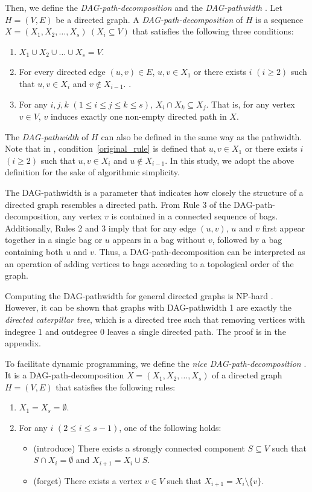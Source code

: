 \documentclass[runningheads]{llncs}
\theoremstyle{plain}
\theoremstyle{definition}
\begin{document}
Then, we define the \emph{DAG-path-decomposition} and the \emph{DAG-pathwidth} \cite{art12}. Let $H = (V, E)$ be a directed graph. A \emph{DAG-path-decomposition} of $H$ is a sequence $X = (X_1, X_2, \dots, X_s) ~(X_i \subseteq V)$ that satisfies the following three conditions:
\begin{enumerate}
    \item $X_1 \cup X_2 \cup \dots \cup X_s = V$.
    \item For every directed edge $(u, v) \in E$, $u, v \in X_1$ or there exists $i$ $(i \geq 2)$ such that $u, v \in X_i$ and $v \notin X_{i-1}$. \label{original_rule}.
    \item For any $i, j, k$ $(1 \leq i \leq j \leq k \leq s)$, $X_i \cap X_k \subseteq X_j$. That is, for any vertex $v \in V$, $v$ induces exactly one non-empty directed path in $X$.
\end{enumerate}

The \emph{DAG-pathwidth} of $H$ can also be defined in the same way as the pathwidth. Note that in \cite{art12}, condition~\ref{original_rule} is defined that $u, v \in X_1$ or there exists $i$ $(i \geq 2)$ such that $u, v \in X_i$ and $u \notin X_{i-1}$. In this study, we adopt the above definition for the sake of algorithmic simplicity.

The DAG-pathwidth is a parameter that indicates how closely the structure of a directed graph resembles a directed path. From Rule 3 of the DAG-path-decomposition, any vertex $v$ is contained in a connected sequence of bags. Additionally, Rules 2 and 3 imply that for any edge $(u, v)$, $u$ and $v$ first appear together in a single bag or $u$ appears in a bag without $v$, followed by a bag containing both $u$ and $v$. Thus, a DAG-path-decomposition can be interpreted as an operation of adding vertices to bags according to a topological order of the graph.

Computing the DAG-pathwidth for general directed graphs is NP-hard \cite{art12}. However, it can be shown that graphs with DAG-pathwidth 1 are exactly the \emph{directed caterpillar tree}, which is a directed tree such that removing vertices with indegree 1 and outdegree 0 leaves a single directed path. The proof is in the appendix.

To facilitate dynamic programming, we define the \emph{nice DAG-path-decomposition} \cite{art12}. It is a DAG-path-decomposition $X = (X_1, X_2, \dots, X_s)$ of a directed graph $H = (V, E)$ that satisfies the following rules:
\begin{enumerate}
    \item $X_1 = X_s = \emptyset$.
    \item For any $i$ $(2 \leq i \leq s - 1)$, one of the following holds:
    \begin{itemize}
        \item (introduce) There exists a strongly connected component $S \subseteq V$ such that $S \cap X_i = \emptyset$ and $X_{i+1} = X_i \cup S$.
        \item (forget) There exists a vertex $v \in V$ such that $X_{i+1} = X_i \setminus \{v\}$.
    \end{itemize}
\end{enumerate}
\end{document}

